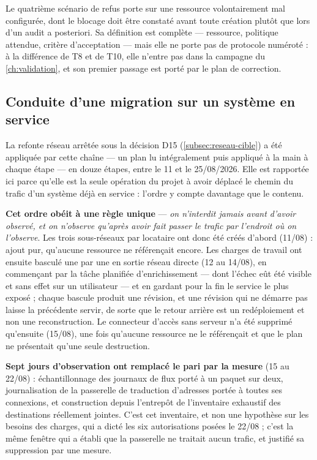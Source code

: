 Le quatrième scénario de refus porte sur une ressource volontairement mal configurée, dont le
blocage doit être constaté avant toute création plutôt que lors d'un audit a posteriori. Sa
définition est complète --- ressource, politique attendue, critère d'acceptation --- mais elle ne
porte pas de protocole numéroté : à la différence de T8 et de T10, elle n'entre pas dans la campagne
du \cref{ch:validation}, et son premier passage est porté par le plan de correction.

\subsection{Conduite d'une migration sur un système en service}
\label{subsec:migration-reseau}

La refonte réseau arrêtée sous la décision D15 (\cref{subsec:reseau-cible}) a été appliquée par
cette chaîne --- un plan lu intégralement puis appliqué à la main à chaque étape --- en douze étapes,
entre le 11 et le 25/08/2026. Elle est rapportée ici parce qu'elle est la seule opération du projet
à avoir déplacé le chemin du trafic d'un système déjà en service : l'ordre y compte davantage que le
contenu.

\textbf{Cet ordre obéit à une règle unique} --- \emph{on n'interdit jamais avant d'avoir observé,
et on n'observe qu'après avoir fait passer le trafic par l'endroit où on l'observe}. Les trois
sous-réseaux par locataire ont donc été créés d'abord (11/08) : ajout pur, qu'aucune ressource ne
référençait encore. Les charges de travail ont ensuite basculé une par une en sortie réseau
directe (12 au 14/08), en commençant par la tâche planifiée d'enrichissement --- dont l'échec eût
été visible et sans effet sur un utilisateur --- et en gardant pour la fin le service le plus
exposé ; chaque bascule produit une révision, et une révision qui ne démarre pas laisse la
précédente servir, de sorte que le retour arrière est un redéploiement et non une reconstruction.
Le connecteur d'accès sans serveur n'a été supprimé qu'ensuite (15/08), une fois qu'aucune
ressource ne le référençait et que le plan ne présentait qu'une seule destruction.

\textbf{Sept jours d'observation ont remplacé le pari par la mesure} (15 au 22/08) : échantillonnage
des journaux de flux porté à un paquet sur deux, journalisation de la passerelle de traduction
d'adresses portée à toutes ses connexions, et construction depuis l'entrepôt de l'inventaire exhaustif
des destinations réellement jointes. C'est cet inventaire, et non une hypothèse sur les besoins des
charges, qui a dicté les six autorisations posées le 22/08 ; c'est la même fenêtre qui a établi que
la passerelle ne traitait aucun trafic, et justifié sa suppression par une mesure.

